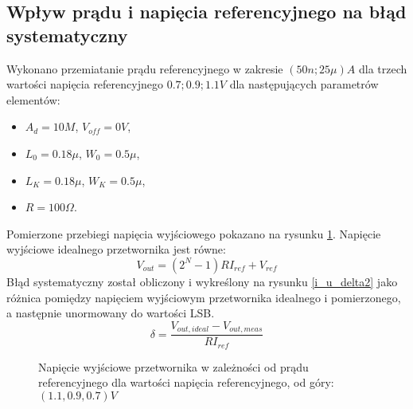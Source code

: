 \documentclass[10pt,a4paper,twoside]{report}
\theoremstyle{definition}
\theoremstyle{definition}
\theoremstyle{definition}
\theoremstyle{definition}
\theoremstyle{definition}
\begin{document}
{{	\subsection{Wpływ prądu i napięcia referencyjnego na błąd systematyczny}
	{	Wykonano przemiatanie prądu referencyjnego w zakresie $(50n; 25\mu)A$ dla trzech wartości napięcia referencyjnego ${0.7;0.9;1.1}V$ dla następujących parametrów elementów: 
	\begin{itemize}
	\item $A_d = 10M$, $V_{off} = 0V$,
	\item $L_0 = 0.18\mu$, $W_0 = 0.5\mu$,
	\item $L_K = 0.18\mu$, $W_K = 0.5\mu$,
	\item $R = 100 \Omega$.
	\end{itemize}
	Pomierzone przebiegi napięcia wyjściowego pokazano na rysunku \ref{i_u_depend}. Napięcie wyjściowe idealnego przetwornika jest równe:
		\begin{equation}
			V_{out} = (2^{N}-1)R I_{ref} + V_{ref}
		\end{equation}
	Błąd systematyczny został obliczony i wykreślony na rysunku \ref{i_u_delta2} jako różnica pomiędzy napięciem wyjściowym przetwornika idealnego i pomierzonego, a następnie unormowany do wartości LSB.
		\begin{equation}
			\delta = \frac{V_{out,ideal} - V_{out,meas}}{R I_{ref}}
		\end{equation}
	}		

	
	\begin{figure}[!ht]
		\centering
		\caption{Napięcie wyjściowe przetwornika w zależności od prądu referencyjnego dla wartości napięcia referencyjnego, od góry: $(1.1,0.9,0.7)V$}
		\label{i_u_depend}
	\end{figure}
		
}}
\end{document}
